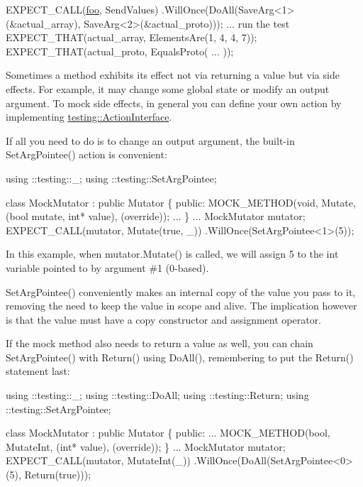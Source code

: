 \begin{DoxyCode}
EXPECT\_CALL(\mbox{\hyperlink{namespacefoo}{foo}}, SendValues)
    .WillOnce(DoAll(SaveArg<1>(&actual\_array), SaveArg<2>(&actual\_proto)));
... run the test
EXPECT\_THAT(actual\_array, ElementsAre(1, 4, 4, 7));
EXPECT\_THAT(actual\_proto, EqualsProto( ... ));
\end{DoxyCode}


Sometimes a method exhibits its effect not via returning a value but via side effects. For example, it may change some global state or modify an output argument. To mock side effects, in general you can define your own action by implementing {\ttfamily \mbox{\hyperlink{classtesting_1_1ActionInterface}{testing\+::\+Action\+Interface}}}.

If all you need to do is to change an output argument, the built-\/in {\ttfamily Set\+Arg\+Pointee()} action is convenient\+:


\begin{DoxyCode}
using ::testing::\_;
using ::testing::SetArgPointee;

\textcolor{keyword}{class }MockMutator : \textcolor{keyword}{public} Mutator \{
 \textcolor{keyword}{public}:
  MOCK\_METHOD(\textcolor{keywordtype}{void}, Mutate, (\textcolor{keywordtype}{bool} mutate, \textcolor{keywordtype}{int}* value), (\textcolor{keyword}{override}));
  ...
\}
...
  MockMutator mutator;
  EXPECT\_CALL(mutator, Mutate(\textcolor{keyword}{true}, \_))
      .WillOnce(SetArgPointee<1>(5));
\end{DoxyCode}


In this example, when {\ttfamily mutator.\+Mutate()} is called, we will assign 5 to the {\ttfamily int} variable pointed to by argument \#1 (0-\/based).

{\ttfamily Set\+Arg\+Pointee()} conveniently makes an internal copy of the value you pass to it, removing the need to keep the value in scope and alive. The implication however is that the value must have a copy constructor and assignment operator.

If the mock method also needs to return a value as well, you can chain {\ttfamily Set\+Arg\+Pointee()} with {\ttfamily Return()} using {\ttfamily Do\+All()}, remembering to put the {\ttfamily Return()} statement last\+:


\begin{DoxyCode}
using ::testing::\_;
using ::testing::DoAll;
using ::testing::Return;
using ::testing::SetArgPointee;

\textcolor{keyword}{class }MockMutator : \textcolor{keyword}{public} Mutator \{
 \textcolor{keyword}{public}:
  ...
  MOCK\_METHOD(\textcolor{keywordtype}{bool}, MutateInt, (\textcolor{keywordtype}{int}* value), (\textcolor{keyword}{override}));
\}
...
  MockMutator mutator;
  EXPECT\_CALL(mutator, MutateInt(\_))
      .WillOnce(DoAll(SetArgPointee<0>(5),
                      Return(\textcolor{keyword}{true})));
\end{DoxyCode}



